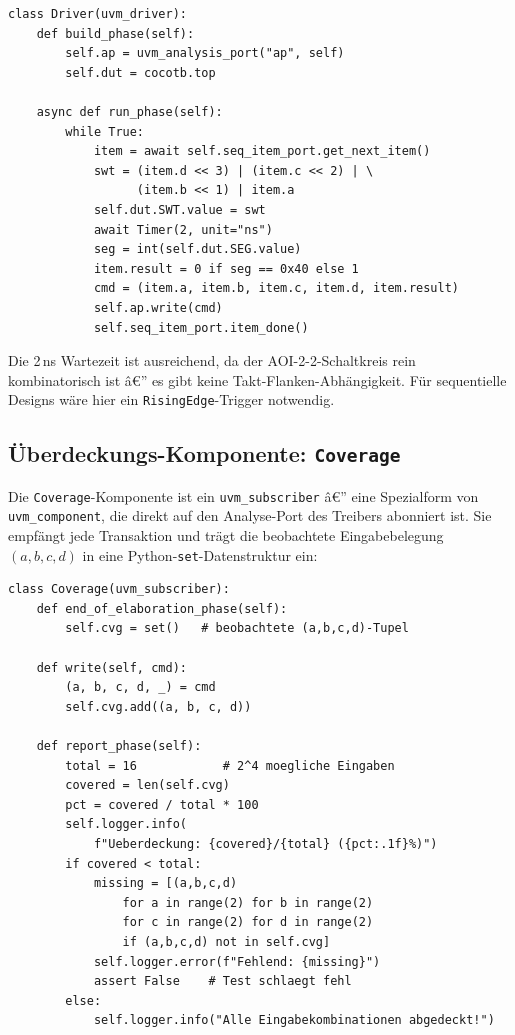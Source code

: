 ﻿\documentclass[12pt,a4paper]{report}
\begin{document}
\begin{lstlisting}[style=pythonstyle, caption={Treiber-Logik: DUT-Ansteuerung und Ergebnis-Erfassung}]
class Driver(uvm_driver):
    def build_phase(self):
        self.ap = uvm_analysis_port("ap", self)
        self.dut = cocotb.top

    async def run_phase(self):
        while True:
            item = await self.seq_item_port.get_next_item()
            swt = (item.d << 3) | (item.c << 2) | \
                  (item.b << 1) | item.a
            self.dut.SWT.value = swt
            await Timer(2, unit="ns")
            seg = int(self.dut.SEG.value)
            item.result = 0 if seg == 0x40 else 1
            cmd = (item.a, item.b, item.c, item.d, item.result)
            self.ap.write(cmd)
            self.seq_item_port.item_done()
\end{lstlisting}

Die 2\,ns Wartezeit ist ausreichend, da der AOI-2-2-Schaltkreis rein
kombinatorisch ist â€” es gibt keine Takt-Flanken-Abhängigkeit. Für
sequentielle Designs wäre hier ein \texttt{RisingEdge}-Trigger notwendig.

\subsection{Überdeckungs-Komponente: \texttt{Coverage}}
\label{sssec:coverage_comp}

Die \texttt{Coverage}-Komponente ist ein \texttt{uvm\_subscriber} â€” eine
Spezialform von \texttt{uvm\_component}, die direkt auf den Analyse-Port des
Treibers abonniert ist. Sie empfängt jede Transaktion und trägt die beobachtete
Eingabebelegung $(a, b, c, d)$ in eine Python-\texttt{set}-Datenstruktur ein:

\begin{lstlisting}[style=pythonstyle, caption={\texttt{Coverage}: Überdeckungs-Tracking und Berichterstattung}]
class Coverage(uvm_subscriber):
    def end_of_elaboration_phase(self):
        self.cvg = set()   # beobachtete (a,b,c,d)-Tupel

    def write(self, cmd):
        (a, b, c, d, _) = cmd
        self.cvg.add((a, b, c, d))

    def report_phase(self):
        total = 16            # 2^4 moegliche Eingaben
        covered = len(self.cvg)
        pct = covered / total * 100
        self.logger.info(
            f"Ueberdeckung: {covered}/{total} ({pct:.1f}%)")
        if covered < total:
            missing = [(a,b,c,d)
                for a in range(2) for b in range(2)
                for c in range(2) for d in range(2)
                if (a,b,c,d) not in self.cvg]
            self.logger.error(f"Fehlend: {missing}")
            assert False    # Test schlaegt fehl
        else:
            self.logger.info("Alle Eingabekombinationen abgedeckt!")
\end{lstlisting}
\end{document}
